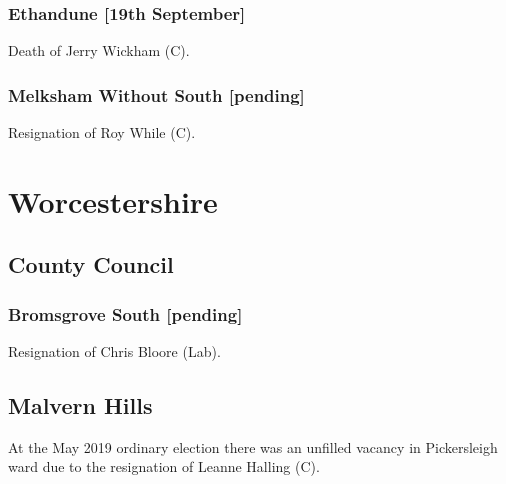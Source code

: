 \documentclass[a4paper,openany]{book}
\begin{document}
\begin{resultsiii}
\subsubsection*{Ethandune \hspace*{\fill}\nolinebreak[1]%
	\enspace\hspace*{\fill}
	[19th September]}


Death of Jerry Wickham (C).

\subsubsection*{Melksham Without South \hspace*{\fill}\nolinebreak[1]%
	\enspace\hspace*{\fill}
	[pending]}


Resignation of Roy While (C).

\section{Worcestershire}

\subsection*{County Council}

\subsubsection*{Bromsgrove South \hspace*{\fill}\nolinebreak[1]%
	\enspace\hspace*{\fill}
	[pending]}


Resignation of Chris Bloore (Lab).

\subsection*{Malvern Hills}

At the May 2019 ordinary election there was an unfilled vacancy in Pickersleigh ward due to the resignation of Leanne Halling (C).


\end{resultsiii}
\end{document}
